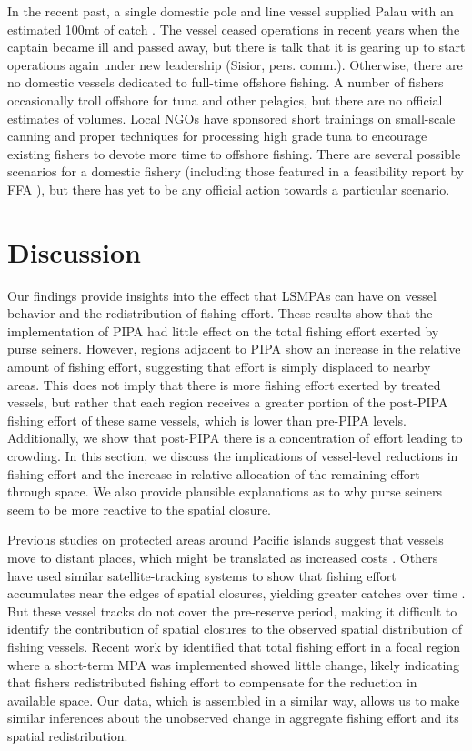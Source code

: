 \documentclass[9pttwoside,lineno]{pnas-new}
\begin{document}
In the recent past, a single domestic pole and line vessel supplied Palau with an estimated 100mt of catch \cite{Gillett2016}. The vessel ceased operations in recent years when the captain became ill and passed away, but there is talk that it is gearing up to start operations again under new leadership (Sisior, pers. comm.). Otherwise, there are no domestic vessels dedicated to full-time offshore fishing. A number of fishers occasionally troll offshore for tuna and other pelagics, but there are no official estimates of volumes. 
Local NGOs have sponsored short trainings on small-scale canning and proper techniques for processing high grade tuna to encourage existing fishers to devote more time to offshore fishing. There are several possible scenarios for a domestic fishery (including those featured in a feasibility report by FFA \citep{Skirtun2017}), but there has yet to be any official action towards a particular scenario. 
 
\clearpage


\section{Discussion}\label{discussion}

Our findings provide insights into the effect that LSMPAs
can have on vessel behavior and the redistribution of fishing effort.
These results show that the implementation of PIPA had
little effect on the total fishing effort exerted by purse seiners. However, regions
adjacent to PIPA show an increase in the relative amount of fishing
effort, suggesting that effort is simply displaced to nearby areas.
This does not imply that there is more fishing effort exerted by treated
vessels, but rather that each region receives a greater portion of the
post-PIPA fishing effort of these same vessels, which is lower than
pre-PIPA levels. Additionally, we show that post-PIPA there is a
concentration of effort leading to crowding. In this section, we discuss
the implications of vessel-level reductions in fishing effort and the
increase in relative allocation of the remaining effort through space.
We also provide plausible explanations as to why purse seiners seem to
be more reactive to the spatial closure.

Previous studies on protected areas around Pacific islands suggest that vessels move to
distant places, which might be translated as increased costs
\citep{stevenson_2013}. Others have used similar satellite-tracking systems to
show that fishing effort accumulates near the edges of spatial closures,
yielding greater catches over time \citep{murawski_2005}. But these vessel tracks
do not cover the pre-reserve period, making it difficult to identify the
contribution of spatial closures to the observed spatial distribution of
fishing vessels. Recent work by \cite{elahi_2018} identified that total
fishing effort in a focal region where a short-term MPA was implemented
showed little change, likely indicating that fishers redistributed
fishing effort to compensate for the reduction in available space. Our
data, which is assembled in a similar way, allows us to make similar
inferences about the unobserved change in aggregate fishing effort and
its spatial redistribution.
\end{document}
